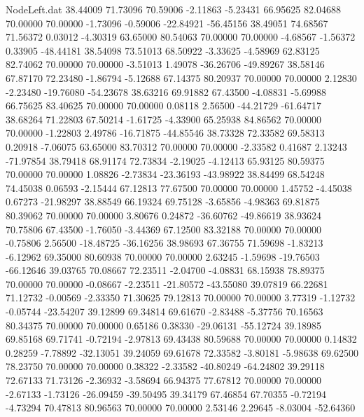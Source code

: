 \begin{filecontents}{NodeLeft.dat}
  38.44009   71.73096   70.59006    -2.11863   -5.23431   66.95625   82.04688   70.00000   70.00000   -1.73096   -0.59006  -22.84921  -56.45156
  38.49051   74.68567   71.56372     0.03012   -4.30319   63.65000   80.54063   70.00000   70.00000   -4.68567   -1.56372    0.33905  -48.44181
  38.54098   73.51013   68.50922    -3.33625   -4.58969   62.83125   82.74062   70.00000   70.00000   -3.51013    1.49078  -36.26706  -49.89267
  38.58146   67.87170   72.23480    -1.86794   -5.12688   67.14375   80.20937   70.00000   70.00000    2.12830   -2.23480  -19.76080  -54.23678
  38.63216   69.91882   67.43500    -4.08831   -5.69988   66.75625   83.40625   70.00000   70.00000    0.08118    2.56500  -44.21729  -61.64717
  38.68264   71.22803   67.50214    -1.61725   -4.33900   65.25938   84.86562   70.00000   70.00000   -1.22803    2.49786  -16.71875  -44.85546
  38.73328   72.33582   69.58313     0.20918   -7.06075   63.65000   83.70312   70.00000   70.00000   -2.33582    0.41687    2.13243  -71.97854
  38.79418   68.91174   72.73834    -2.19025   -4.12413   65.93125   80.59375   70.00000   70.00000    1.08826   -2.73834  -23.36193  -43.98922
  38.84499   68.54248   74.45038     0.06593   -2.15444   67.12813   77.67500   70.00000   70.00000    1.45752   -4.45038    0.67273  -21.98297
  38.88549   66.19324   69.75128    -3.65856   -4.98363   69.81875   80.39062   70.00000   70.00000    3.80676    0.24872  -36.60762  -49.86619
  38.93624   70.75806   67.43500    -1.76050   -3.44369   67.12500   83.32188   70.00000   70.00000   -0.75806    2.56500  -18.48725  -36.16256
  38.98693   67.36755   71.59698    -1.83213   -6.12962   69.35000   80.60938   70.00000   70.00000    2.63245   -1.59698  -19.76503  -66.12646
  39.03765   70.08667   72.23511    -2.04700   -4.08831   68.15938   78.89375   70.00000   70.00000   -0.08667   -2.23511  -21.80572  -43.55080
  39.07819   66.22681   71.12732    -0.00569   -2.33350   71.30625   79.12813   70.00000   70.00000    3.77319   -1.12732   -0.05744  -23.54207
  39.12899   69.34814   69.61670    -2.83488   -5.37756   70.16563   80.34375   70.00000   70.00000    0.65186    0.38330  -29.06131  -55.12724
  39.18985   69.85168   69.71741    -0.72194   -2.97813   69.43438   80.59688   70.00000   70.00000    0.14832    0.28259   -7.78892  -32.13051
  39.24059   69.61678   72.33582    -3.80181   -5.98638   69.62500   78.23750   70.00000   70.00000    0.38322   -2.33582  -40.80249  -64.24802
  39.29118   72.67133   71.73126    -2.36932   -3.58694   66.94375   77.67812   70.00000   70.00000   -2.67133   -1.73126  -26.09459  -39.50495
  39.34179   67.46854   67.70355    -0.72194   -4.73294   70.47813   80.96563   70.00000   70.00000    2.53146    2.29645   -8.03004  -52.64360

\end{filecontents}
